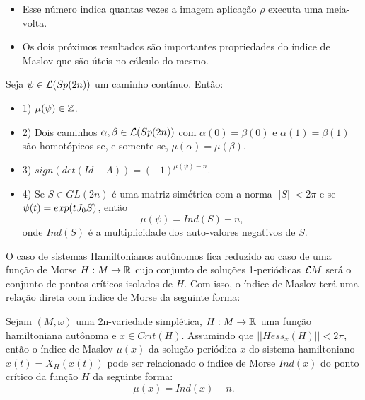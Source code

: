 \documentclass{beamer}
\begin{document}
\begin{frame}
	\begin{itemize}
		\item 
		Esse número indica quantas vezes a imagem aplicação $\rho$ executa uma meia-volta.
		
		\item  Os dois próximos resultados são importantes propriedades do índice de Maslov que são úteis no cálculo do mesmo.
	\end{itemize}
	
	\begin{teorema}
		Seja $\psi\in \mathcal{L}(Sp(2n)) $ um caminho contínuo. Então:
	\end{teorema}
	\begin{itemize}
		
		\item 1) $\mu(\psi) \in \mathbb{Z}$.
		\item 2) Dois caminhos $\alpha, \beta \in \mathcal{L}(Sp(2n)) $ com $\alpha(0) = \beta(0)$ e $\alpha(1) = \beta(1)$ são homotópicos se, e somente se, $\mu(\alpha) = \mu(\beta)$.
		\item 3) $sign(det(Id - A)) = (-1)^{\mu(\psi)-n}$.
		\item 4) Se $S \in GL(2n)$ é uma matriz simétrica com a norma $||S|| < 2\pi$ e se $\psi(t) = exp(tJ_{0} S)$, então 
		$$
		\mu(\psi) = Ind(S) - n,
		$$
		onde $Ind(S)$ é a multiplicidade dos auto-valores negativos de $S$.
	\end{itemize}
\end{frame}


\begin{frame}
	O caso de sistemas Hamiltonianos autônomos fica reduzido ao caso de uma função de Morse $H:M\to \mathbb{R}^{}$ cujo conjunto de soluções 1-periódicas $\mathcal{L}M$ será o conjunto de pontos críticos isolados de $H$. Com isso, o índice de Maslov terá uma relação direta com índice de Morse da seguinte forma:
	
	\begin{corolario}
		Sejam $(M, \omega)$ uma 2n-variedade simplética, $H : M \to \mathbb{R}^{}$ uma função hamiltoniana autônoma e $x \in Crit(H)$. Assumindo que $||Hess_{x}(H)|| < 2\pi$, então o índice de Maslov $\mu(x)$ da solução periódica $x$ do sistema hamiltoniano $\dot{x}(t) = X_{H}(x(t))$ pode ser relacionado o índice de Morse $Ind(x)$ do ponto crítico da função $H$ da seguinte forma:
		$$
		\mu(x) = Ind(x) - n.
		$$
	\end{corolario}
\end{frame}
\end{document}
